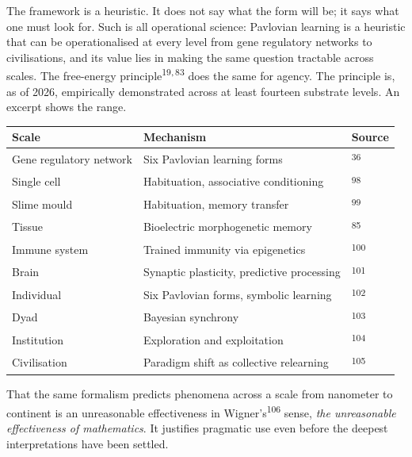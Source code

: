 \begin{widebody}
{\small

The framework is a heuristic. It does not say what the form will be; it says what one must look for. Such is all operational science: Pavlovian learning is a heuristic that can be operationalised at every level from gene regulatory networks to civilisations, and its value lies in making the same question tractable across scales. The free-energy principle\textsuperscript{19,\,83} does the same for agency. The principle is, as of 2026, empirically demonstrated across at least fourteen substrate levels. An excerpt shows the range.

\bigskip
\begin{center}
\footnotesize
\renewcommand{\arraystretch}{1.2}
\begin{tabular}{@{}p{38mm}p{50mm}l@{}}
\toprule
\textbf{Scale} & \textbf{Mechanism} & \textbf{Source} \\
\midrule
Gene regulatory network & Six Pavlovian learning forms & \textsuperscript{36} \\
Single cell & Habituation, associative conditioning & \textsuperscript{98} \\
Slime mould & Habituation, memory transfer & \textsuperscript{99} \\
Tissue & Bioelectric morphogenetic memory & \textsuperscript{85} \\
Immune system & Trained immunity via epigenetics & \textsuperscript{100} \\
Brain & Synaptic plasticity, predictive processing & \textsuperscript{101} \\
Individual & Six Pavlovian forms, symbolic learning & \textsuperscript{102} \\
Dyad & Bayesian synchrony & \textsuperscript{103} \\
Institution & Exploration and exploitation & \textsuperscript{104} \\
Civilisation & Paradigm shift as collective relearning & \textsuperscript{105} \\
\bottomrule
\end{tabular}
\end{center}
\bigskip

That the same formalism predicts phenomena across a scale from nanometer to continent is an unreasonable effectiveness in Wigner's\textsuperscript{106} sense, \textit{the unreasonable effectiveness of mathematics}. It justifies pragmatic use even before the deepest interpretations have been settled.

}
\end{widebody}
